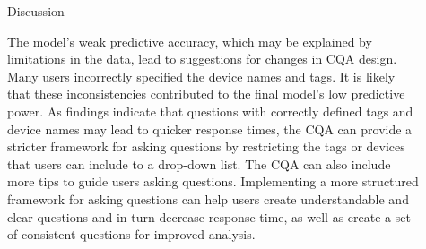 \documentclass[final]{beamer}
\newlength{\sepwid}
\newlength{\onecolwid}
\newlength{\twocolwid}
\begin{document}
\begin{frame}[t]
\begin{columns}[t]
\begin{column}{\twocolwid}
\begin{columns}[t,totalwidth=\twocolwid]
\begin{column}{\onecolwid}
% 
% 
% 
% 
% 


\end{column} %

\end{columns} %

\end{column} %

\begin{column}{\sepwid}\end{column} %

\begin{column}{\onecolwid} %


\begin{block}{Discussion}

The model's weak predictive accuracy, which may be explained by limitations in the data, lead to suggestions for changes in CQA design. Many users incorrectly specified the device names and tags. It is likely that these inconsistencies contributed to the final model's low predictive power. As findings indicate that questions with correctly defined tags and device names may lead to quicker response times, the CQA can provide a stricter framework for asking questions by restricting the tags or devices that users can include to a drop-down list. The CQA can also include more tips to guide users asking questions. Implementing a more structured framework for asking questions can help users create understandable and clear questions and in turn decrease response time, as well as create a set of consistent questions for improved analysis. 


\end{block}
\end{column}
\end{columns}
\end{frame}
\end{document}
